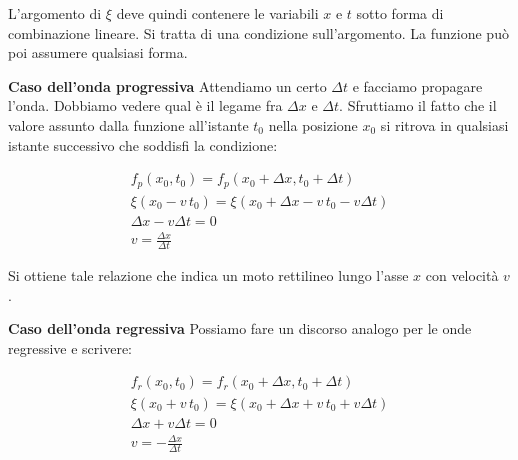 \begin{figure}[htpb]
\end{figure}
\FloatBarrier

L'argomento di $\xi$ deve quindi contenere le variabili $x$ e $t$ sotto forma di combinazione lineare. Si tratta di una condizione sull'argomento. La funzione può poi assumere qualsiasi forma.

\textbf{Caso dell'onda progressiva}
Attendiamo un certo $ \Delta t $ e facciamo propagare l'onda. Dobbiamo vedere qual è il legame fra $ \Delta x $ e $ \Delta t $. Sfruttiamo il fatto che il valore assunto dalla funzione all'istante $t_0 $ nella posizione $x_0$ si ritrova in qualsiasi istante successivo che soddisfi la condizione:

\begin{gather*}
	f_p(x_0,t_0) = f_p(x_0+\Delta x,t_0+\Delta t) \\
	\xi(x_0-v\,t_0) = \xi(x_0+\Delta x-v\,t_0-v\Delta t) \\
	\Delta x - v\Delta t = 0 \\
	v = \frac{\Delta x}{\Delta t}
\end{gather*}

Si ottiene tale relazione che indica un moto rettilineo lungo l'asse $x$ con velocità $v$.

\textbf{Caso dell'onda regressiva}
Possiamo fare un discorso analogo per le onde regressive e scrivere:

\begin{gather*}
	f_r(x_0,t_0) = f_r(x_0+\Delta x,t_0+\Delta t) \\
	\xi(x_0+v\,t_0) = \xi(x_0+\Delta x + v\,t_0 + v\Delta t) \\
	\Delta x + v\Delta t = 0 \\
	v = - \frac{\Delta x}{\Delta t}
\end{gather*}

